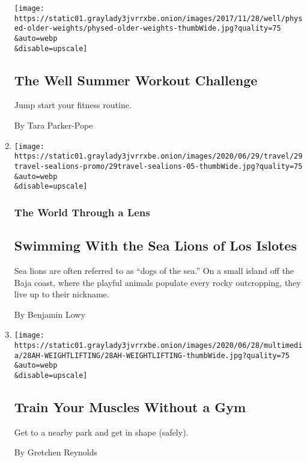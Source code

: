 \begin{enumerate}
  \texttt{[image: https://static01.graylady3jvrrxbe.onion/images/2017/11/28/well/physed-older-weights/physed-older-weights-thumbWide.jpg?quality=75\\\&auto=webp\\\&disable=upscale]}

  \hypertarget{the-well-summer-workout-challenge}{%
  \subsection{The Well Summer Workout
  Challenge}\label{the-well-summer-workout-challenge}}

  Jump start your fitness routine.

  By Tara Parker-Pope
\item
  \href{/2020/06/29/travel/sea-lions-los-islotes.html}{}

  \texttt{[image: https://static01.graylady3jvrrxbe.onion/images/2020/06/29/travel/29travel-sealions-promo/29travel-sealions-05-thumbWide.jpg?quality=75\\\&auto=webp\\\&disable=upscale]}

  \hypertarget{the-world-through-a-lens-2}{%
  \subsubsection{The World Through a
  Lens}\label{the-world-through-a-lens-2}}

  \hypertarget{swimming-with-the-sea-lions-of-los-islotes}{%
  \subsection{Swimming With the Sea Lions of Los
  Islotes}\label{swimming-with-the-sea-lions-of-los-islotes}}

  Sea lions are often referred to as ``dogs of the sea.'' On a small
  island off the Baja coast, where the playful animals populate every
  rocky outcropping, they live up to their nickname.

  By Benjamin Lowy
\item
  \href{/2020/06/27/at-home/workout-without-a-gym-coronavirus.html}{}

  \texttt{[image: https://static01.graylady3jvrrxbe.onion/images/2020/06/28/multimedia/28AH-WEIGHTLIFTING/28AH-WEIGHTLIFTING-thumbWide.jpg?quality=75\\\&auto=webp\\\&disable=upscale]}

  \hypertarget{train-your-muscles-without-a-gym}{%
  \subsection{Train Your Muscles Without a
  Gym}\label{train-your-muscles-without-a-gym}}

  Get to a nearby park and get in shape (safely).

  By Gretchen Reynolds
\end{enumerate}

